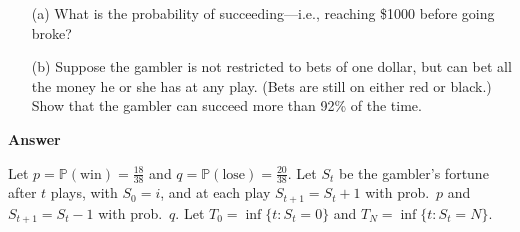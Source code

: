 \documentclass[letterpaper]{article}
\begin{document}
\begin{enumerate}
\item[(a)] What is the probability of succeeding---i.e., reaching \$1000 before going broke?

\item[(b)] Suppose the gambler is not restricted to bets of one dollar, but can bet all the money he or she has at any play. (Bets are still on either red or black.) Show that the gambler can succeed more than 92\% of the time.

\end{enumerate}
		
		\textbf{Answer}
		
		Let $p=\mathbb{P}(\text{win})=\frac{18}{38}$ and $q=\mathbb{P}(\text{lose})=\frac{20}{38}$.
		Let $S_t$ be the gambler's fortune after $t$ plays, with $S_0=i$, and at each play
		$S_{t+1}=S_t+1$ with prob.\ $p$ and $S_{t+1}=S_t-1$ with prob.\ $q$.
		Let
		$T_0=\inf\{t:S_t=0\}$ and $T_N=\inf\{t:S_t=N\}$.
		
\end{document}
